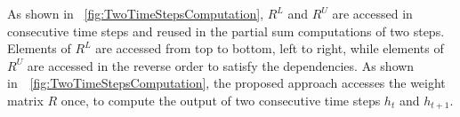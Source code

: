 \documentclass[a4paper,10pt]{article}
\begin{document}
As shown in \figurename{~\ref{fig:TwoTimeStepsComputation}}, $R^L$ and $R^U$ are accessed in consecutive time steps and reused in the partial sum computations of two steps. 
Elements of $R^L$ are accessed from top to bottom, left to right, while elements of $R^U$ are accessed in the reverse order to satisfy the dependencies. As shown in~\figurename{~\ref{fig:TwoTimeStepsComputation}}, the proposed approach accesses the weight matrix $R$ once, to compute the output of two consecutive time steps $h_{t}$ and $h_{t+1}$. 
\end{document}
